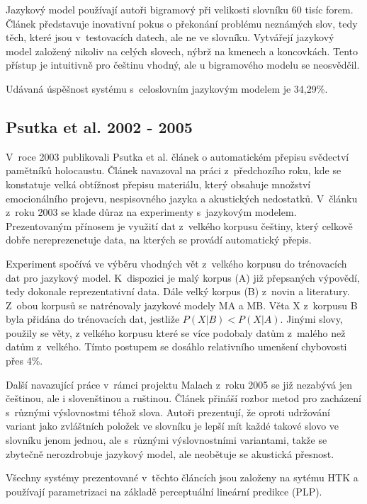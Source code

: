 Jazykový model používají autoři bigramový při velikosti slovníku 60 tisíc forem.
Článek představuje inovativní pokus o překonání problému neznámých slov, tedy
těch, které jsou v~testovacích datech, ale ne ve slovníku. Vytvářejí jazykový
model založený nikoliv na celých slovech, nýbrž na kmenech a koncovkách. Tento
přístup je intuitivně pro češtinu vhodný, ale u bigramového modelu se
neosvědčil.

Udávaná úspěšnost systému s~celoslovním jazykovým modelem je 34,29\%.

\subsection{Psutka et al. 2002 - 2005}

V~roce 2003 publikovali Psutka et al. článek o automatickém přepisu svědectví
pamětníků holocaustu\cite{psutka2003large}. Článek navazoval na práci
z~předchozího roku\cite{psutka2002automatic}, kde se konstatuje velká obtížnost
přepisu materiálu, který obsahuje množství emocionálního projevu, nespisovného
jazyka a akustických nedostatků. V~článku z~roku 2003 se klade důraz na
experimenty s~jazykovým modelem. Prezentovaným přínosem je využití dat z~velkého
korpusu češtiny, který celkově dobře nereprezenetuje data, na kterých se provádí
automatický přepis.

Experiment spočívá ve výběru vhodných vět z~velkého korpusu do trénovacích dat
pro jazykový model. K~dispozici je malý korpus (A) již přepsaných výpovědí, tedy
dokonale reprezentativní data. Dále velký korpus (B) z~novin a literatury.
Z~obou korpusů se natrénovaly jazykové modely MA a MB. Věta X z~korpusu B byla
přidána do trénovacích dat, jestliže $P(X|B) < P(X|A)$. Jinými slovy, použily se
věty, z velkého korpusu které se více podobaly datům z~malého než datům
z~velkého. Tímto postupem se dosáhlo relativního umenšení chybovosti přes 4\%.

Další navazující práce v~rámci projektu Malach\cite{psutka2005automatic} z~roku
2005 se již nezabývá jen češtinou, ale i slovenštinou a ruštinou. Článek
přináší rozbor metod pro zacházení s~různými výslovnostmi téhož slova. Autoři
prezentují, že oproti udržování variant jako zvláštních položek ve slovníku je
lepší mít každé takové slovo ve slovníku jenom jednou, ale s~různými
výslovnostními variantami, takže se zbytečně nerozdrobuje jazykový model, ale
neobětuje se akustická přesnost.

Všechny systémy prezentované v~těchto článcích jsou založeny na sytému HTK a
používají parametrizaci na základě perceptuální lineární predikce (PLP).

